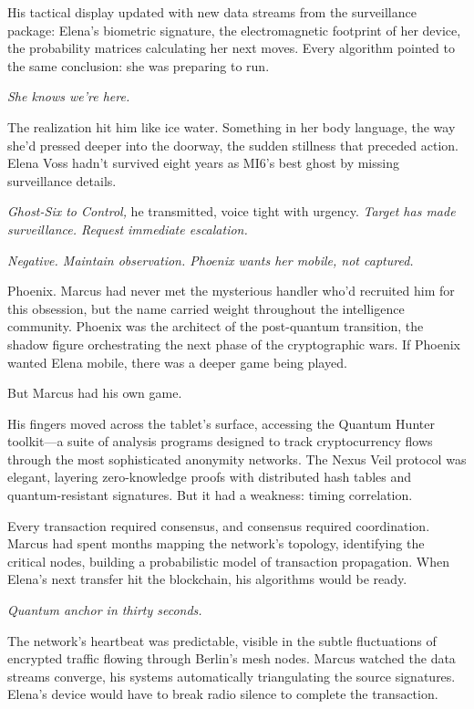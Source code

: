 His tactical display updated with new data streams from the surveillance package: Elena's biometric signature, the electromagnetic footprint of her device, the probability matrices calculating her next moves. Every algorithm pointed to the same conclusion: she was preparing to run.

\emph{She knows we're here.}

The realization hit him like ice water. Something in her body language, the way she'd pressed deeper into the doorway, the sudden stillness that preceded action. Elena Voss hadn't survived eight years as MI6's best ghost by missing surveillance details.

\emph{Ghost-Six to Control,} he transmitted, voice tight with urgency. \emph{Target has made surveillance. Request immediate escalation.}

\emph{Negative. Maintain observation. Phoenix wants her mobile, not captured.}

Phoenix. Marcus had never met the mysterious handler who'd recruited him for this obsession, but the name carried weight throughout the intelligence community. Phoenix was the architect of the post-quantum transition, the shadow figure orchestrating the next phase of the cryptographic wars. If Phoenix wanted Elena mobile, there was a deeper game being played.

But Marcus had his own game.

His fingers moved across the tablet's surface, accessing the Quantum Hunter toolkit---a suite of analysis programs designed to track cryptocurrency flows through the most sophisticated anonymity networks. The Nexus Veil protocol was elegant, layering zero-knowledge proofs with distributed hash tables and quantum-resistant signatures. But it had a weakness: timing correlation.

Every transaction required consensus, and consensus required coordination. Marcus had spent months mapping the network's topology, identifying the critical nodes, building a probabilistic model of transaction propagation. When Elena's next transfer hit the blockchain, his algorithms would be ready.

\emph{Quantum anchor in thirty seconds.}

The network's heartbeat was predictable, visible in the subtle fluctuations of encrypted traffic flowing through Berlin's mesh nodes. Marcus watched the data streams converge, his systems automatically triangulating the source signatures. Elena's device would have to break radio silence to complete the transaction.

